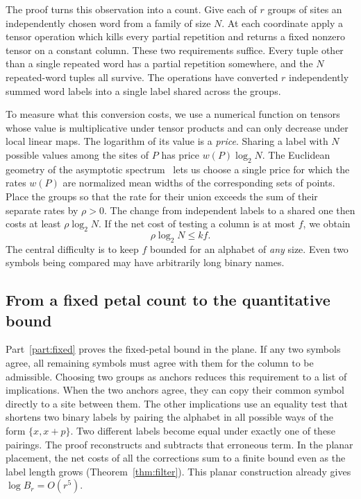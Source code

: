 The proof turns this observation into a count. Give each of \(r\)
groups of sites an independently chosen word from a family of size \(N\).
At each coordinate apply a tensor operation which kills every partial
repetition and returns a fixed nonzero tensor on a constant column.
These two requirements suffice. Every tuple other than a single repeated word
has a partial repetition somewhere, and the \(N\) repeated-word tuples
all survive. The operations have converted \(r\) independently summed
word labels into a single label shared across the groups.

To measure what this conversion costs, we use a numerical function on
tensors whose value is multiplicative under tensor products and can only
decrease under local linear maps. The logarithm of its value is a
\emph{price}. Sharing a label with \(N\) possible values among the sites
of \(P\) has price \(w(P)\log_2 N\). The Euclidean geometry of the
asymptotic spectrum~\cite{oaG} lets us choose a single price for which
the rates \(w(P)\) are normalized mean widths of the corresponding
sets of points. Place the groups so that the rate for their union
exceeds the sum of their separate rates by \(\rho>0\). The change from
independent labels to a shared one then costs at least \(\rho\log_2 N\).
If the net cost of testing a column is at most \(f\), we obtain
\[
                          \rho\log_2 N\le kf .
\]
The central difficulty is to keep \(f\) bounded for an alphabet of
\emph{any} size. Even two symbols being compared may have arbitrarily
long binary names.

\par{}
\subsection{From a fixed petal count to the quantitative bound}

Part~\ref{part:fixed} proves the fixed-petal bound in the plane. If any
two symbols agree, all remaining symbols must agree with them for the
column to be admissible. Choosing two groups as anchors reduces this
requirement to a list of implications. When the two anchors agree,
they can copy their common symbol directly to a site between them.
The other implications use an equality test that shortens two binary
labels by pairing the alphabet in all possible ways of the form \(\{x,x+p\}\). Two different labels become equal
under exactly one of these pairings. The proof reconstructs and
subtracts that erroneous term. In the planar placement, the net costs
of all the corrections sum to a finite bound even as the label length
grows (Theorem~\ref{thm:filter}). This planar construction already
gives \(\log B_r=O(r^5)\).


